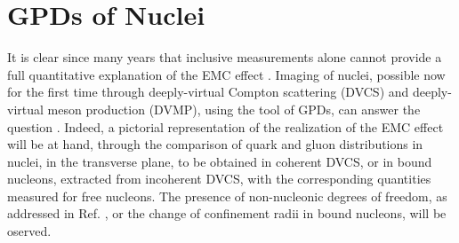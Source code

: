 \section{GPDs of Nuclei}

It is clear since many years that inclusive measurements alone cannot
provide a 
full quantitative explanation of the EMC
effect \cite{Aubert:1983xm}.
Imaging of nuclei, possible now for the first time
through deeply-virtual Compton scattering (DVCS) and deeply-virtual meson production (DVMP), using the tool of GPDs, can
answer the question \cite{Dupre:2015jha}. Indeed,
a pictorial representation of the realization of the
EMC effect will be at hand, through the comparison of 
quark and gluon distributions 
in nuclei, in the transverse plane, to be obtained in coherent DVCS, or 
in bound nucleons, extracted from incoherent DVCS, with the corresponding
quantities measured for free nucleons.
The presence of non-nucleonic degrees of freedom, 
as addressed in Ref. \cite{primo},
or the 
change of confinement radii in bound nucleons, will be oserved. 

